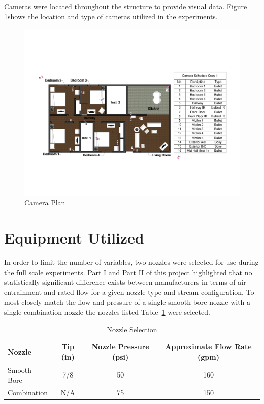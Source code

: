 \documentclass[12pt,oneside]{book}
\begin{document}
Cameras were located throughout the structure to provide visual data. Figure \ref{fig:cameras}shows the location and type of cameras utilized in the experiments.

\begin{figure}[H]
	\includegraphics[width=.75\textheight]{0_Images/Ranch_Pictures/Camera_Plan}
	\caption{Camera Plan}
	\label{fig:cameras}
\end{figure}
\clearpage 

\section{Equipment Utilized}

In order to limit the number of variables, two nozzles were selected for use during the full scale experiments. Part I \cite{Weinchenk_watermapping} and Part II \cite{Weinchenk_airentrainment} of this project highlighted that no statistically significant difference exists between manufacturers in terms of air entrainment and rated flow for a given nozzle type and stream configuration. To most closely match the flow and pressure of a single smooth bore nozzle with a single combination nozzle the nozzles listed Table~\ref{table:nozzle_selection} were selected. 

\begin{table}[H]
\caption{Nozzle Selection}
\centering
\begin{tabular}{|l|c|c|c|}
\hline
Nozzle 		& Tip (in) 	& Nozzle Pressure (psi)	& Approximate Flow Rate (gpm) \\ \hline \hline
Smooth Bore & 	7/8 	& 	50 					& 160 \\ \hline
Combination & 	N/A 	& 	75 					& 150 \\ \hline
\end{tabular}
\label{table:nozzle_selection}
\end{table}
\end{document}
